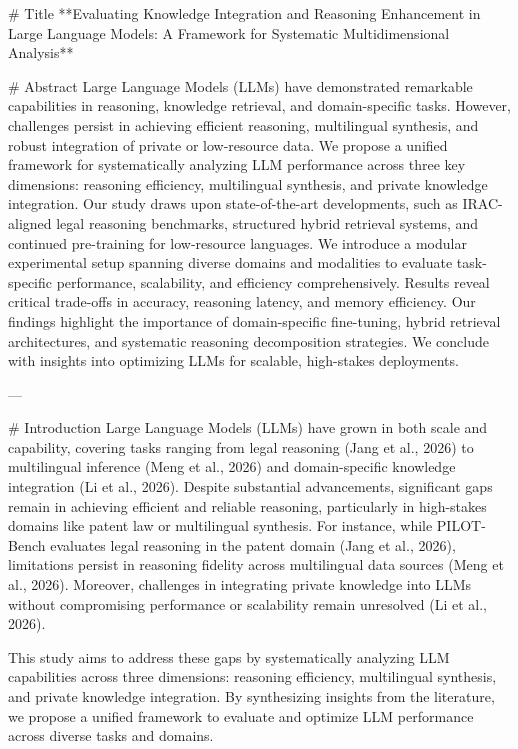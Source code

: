 # Title  
**Evaluating Knowledge Integration and Reasoning Enhancement in Large Language Models: A Framework for Systematic Multidimensional Analysis**

# Abstract  
Large Language Models (LLMs) have demonstrated remarkable capabilities in reasoning, knowledge retrieval, and domain-specific tasks. However, challenges persist in achieving efficient reasoning, multilingual synthesis, and robust integration of private or low-resource data. We propose a unified framework for systematically analyzing LLM performance across three key dimensions: reasoning efficiency, multilingual synthesis, and private knowledge integration. Our study draws upon state-of-the-art developments, such as IRAC-aligned legal reasoning benchmarks, structured hybrid retrieval systems, and continued pre-training for low-resource languages. We introduce a modular experimental setup spanning diverse domains and modalities to evaluate task-specific performance, scalability, and efficiency comprehensively. Results reveal critical trade-offs in accuracy, reasoning latency, and memory efficiency. Our findings highlight the importance of domain-specific fine-tuning, hybrid retrieval architectures, and systematic reasoning decomposition strategies. We conclude with insights into optimizing LLMs for scalable, high-stakes deployments.  

---

# Introduction  
Large Language Models (LLMs) have grown in both scale and capability, covering tasks ranging from legal reasoning (Jang et al., 2026) to multilingual inference (Meng et al., 2026) and domain-specific knowledge integration (Li et al., 2026). Despite substantial advancements, significant gaps remain in achieving efficient and reliable reasoning, particularly in high-stakes domains like patent law or multilingual synthesis. For instance, while PILOT-Bench evaluates legal reasoning in the patent domain (Jang et al., 2026), limitations persist in reasoning fidelity across multilingual data sources (Meng et al., 2026). Moreover, challenges in integrating private knowledge into LLMs without compromising performance or scalability remain unresolved (Li et al., 2026).  

This study aims to address these gaps by systematically analyzing LLM capabilities across three dimensions: reasoning efficiency, multilingual synthesis, and private knowledge integration. By synthesizing insights from the literature, we propose a unified framework to evaluate and optimize LLM performance across diverse tasks and domains.  

